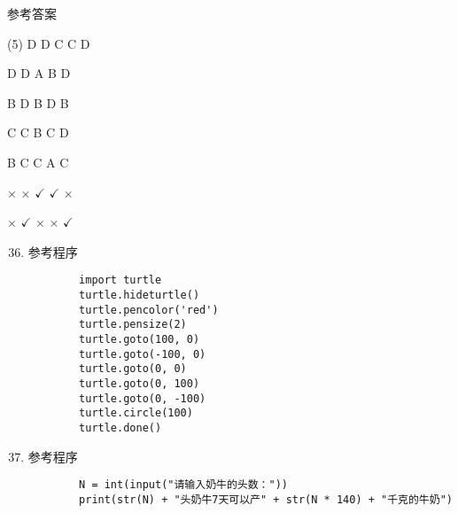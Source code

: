 \documentclass[11pt]{ctexart}
\begin{document}
\begin{center}
    \Huge \heiti 参考答案
\end{center}

    \begin{tasks}[label=\arabic*.](5)
        \task D
        \task D
        \task C
        \task C
        \task D

        \task D
        \task D
        \task A
        \task B
        \task D

        \task B
        \task D
        \task B
        \task D
        \task B

        \task C
        \task C
        \task B
        \task C
        \task D

        \task B
        \task C
        \task C
        \task A
        \task C

        \task $\times$
        \task $\times$
        \task $\checkmark$
        \task $\checkmark$
        \task $\times$

        \task $\times$
        \task $\checkmark$
        \task $\times$
        \task $\times$
        \task $\checkmark$
    \end{tasks}

\begin{enumerate}
    \setcounter{enumi}{35}
    \item 参考程序
    \begin{lstlisting}
        import turtle
        turtle.hideturtle()
        turtle.pencolor('red')
        turtle.pensize(2)
        turtle.goto(100, 0)
        turtle.goto(-100, 0)
        turtle.goto(0, 0)
        turtle.goto(0, 100)
        turtle.goto(0, -100)
        turtle.circle(100)
        turtle.done()
    \end{lstlisting}

    \item 参考程序
    \begin{lstlisting}
        N = int(input("请输入奶牛的头数："))
        print(str(N) + "头奶牛7天可以产" + str(N * 140) + "千克的牛奶")
    \end{lstlisting}
\end{enumerate}
\end{document}
